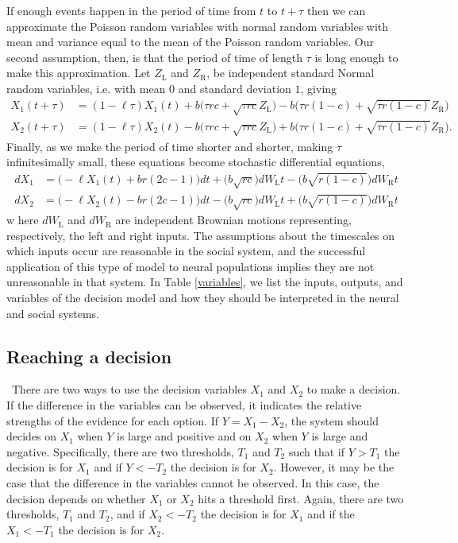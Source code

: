 \documentclass{article}
\begin{document}
If enough events happen in the period of time from $t$ to $t+\tau$ then we can approximate the Poisson random variables with normal random variables with mean and variance equal to the mean of the Poisson random variables.  Our second assumption, then, is that the period of time of length $\tau$ is long enough to make this approximation. Let $Z_\text{L}$ and $Z_\text{R}$, be independent standard Normal random variables, i.e. with mean $0$ and standard deviation $1$, giving
\begin{align*}
X_1(t+\tau)&=(1-\ell\tau)X_1(t)+b\bigg(\tau rc+\sqrt{\tau rc}Z_{\text{L}}\bigg)-b\bigg(\tau r(1-c)+\sqrt{\tau r(1-c)}Z_{\text{R}}\bigg)
\\X_2(t+\tau)&=(1-\ell\tau)X_2(t)-b\bigg(\tau rc+\sqrt{\tau rc}Z_{\text{L}}\bigg)+b\bigg(\tau r(1-c)+\sqrt{\tau r(1-c)}Z_{\text{R}}\bigg).
\end{align*}
Finally, as we make the period of time shorter and shorter, making $\tau$ infinitesimally small, these equations become stochastic differential equations,
\begin{equation}
\begin{array}{ll}
dX_1&=\bigg(-\ell X_1(t)+br(2c-1)\bigg)dt+\bigg(b\sqrt{rc}\bigg)dW_\text{L}t-\bigg(b\sqrt{r(1-c)}\bigg)dW_\text{R}t
\\dX_2&=\bigg(-\ell X_2(t)-br(2c-1)\bigg)dt-\bigg(b\sqrt{rc}\bigg)dW_\text{L}t+\bigg(b\sqrt{r(1-c)}\bigg)dW_\text{R}t
\end{array}
\end{equation}
w here $dW_{\text{L}}$ and $dW_{\text{R}}$ are independent Brownian motions representing, respectively, the left and right inputs.  The assumptions about the timescales on which inputs occur are reasonable in the social system, and the successful application of this type of model to neural populations implies they are not unreasonable in that system.  In Table \ref{variables}, we list the inputs, outputs, and variables of the decision model and how they should be interpreted in the neural and social systems.

\subsection*{Reaching a decision }
\ There are two ways to use the decision variables $X_1$ and $X_2$ to make a decision.  If the difference in the variables can be observed, it indicates the relative strengths of the evidence for each option. If $Y=X_1-X_2$, the system should decides on $X_1$ when $Y$ is large and positive and on $X_2$ when $Y$ is large and negative.  Specifically, there are two thresholds, $T_1$ and $T_2$ such that if $Y>T_1$ the decision is for $X_1$ and if $Y<-T_2$ the decision is for $X_2$.  However, it may be the case that the difference in the variables cannot be observed.  In this case, the decision depends on whether $X_1$ or $X_2$ hits a threshold first.  Again, there are two thresholds, $T_1$ and $T_2$, and if $X_2<-T_2$ the decision is for $X_1$ and if the $X_1<-T_1$ the decision is for $X_2$. 
\end{document}
